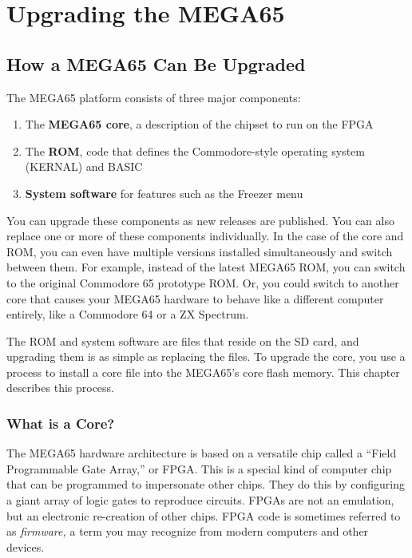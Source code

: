 \chapter{Upgrading the MEGA65}
\label{cha:cores}

\section{How a MEGA65 Can Be Upgraded}

The MEGA65 platform consists of three major components:

\begin{enumerate}
  \item The {\bf MEGA65 core}, a description of the chipset to run on the FPGA
  \item The {\bf ROM}, code that defines the Commodore-style operating system (KERNAL) and BASIC
  \item {\bf System software} for features such as the Freezer menu
\end{enumerate}

You can upgrade these components as new releases are published. You can also replace one or more of these components individually. In the case of the core and ROM, you can even have multiple versions installed simultaneously and switch between them. For example, instead of the latest MEGA65 ROM, you can switch to the original Commodore 65 prototype ROM. Or, you could switch to another core that causes your MEGA65 hardware to behave like a different computer entirely, like a Commodore 64 or a ZX Spectrum.

The ROM and system software are files that reside on the SD card, and upgrading them is as simple as replacing the files. To upgrade the core, you use a process to install a core file into the MEGA65's core flash memory. This chapter describes this process.

\subsection{What is a Core?}

The MEGA65 hardware architecture is based on a versatile chip called a ``Field Programmable Gate Array,'' or FPGA. This is a special kind of computer chip that can be programmed to impersonate other chips. They do this by configuring a giant array of logic gates to reproduce circuits. FPGAs are not an emulation, but an electronic re-creation of other chips. FPGA code is sometimes referred to as {\em firmware,} a term you may recognize from modern computers and other devices.

